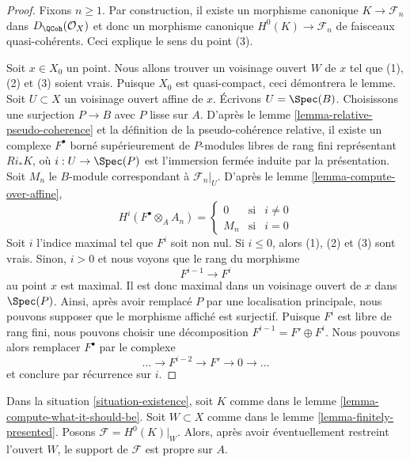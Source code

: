 \begin{proof}
Fixons $n \geq 1$. Par construction, il existe un morphisme canonique
$K \to \mathcal{F}_n$ dans $D_\QCoh(\mathcal{O}_X)$
et donc un morphisme canonique $H^0(K) \to \mathcal{F}_n$
de faisceaux quasi-cohérents. Ceci explique le sens du point (3).

\medskip\noindent
Soit $x \in X_0$ un point.
Nous allons trouver un voisinage ouvert $W$
de $x$ tel que (1), (2) et (3) soient vrais. Puisque $X_0$ est quasi-compact,
ceci démontrera le lemme. Soit $U \subset X$ un voisinage ouvert affine
de $x$. Écrivons $U = \Spec(B)$.
Choisissons une surjection $P \to B$ avec $P$ lisse sur $A$.
D'après le lemme \ref{lemma-relative-pseudo-coherence}
et la définition de la pseudo-cohérence relative,
il existe un complexe $F^\bullet$ borné supérieurement
de $P$-modules libres de rang fini représentant
$Ri_*K$, où $i : U \to \Spec(P)$ est l'immersion
fermée induite par la présentation.
Soit $M_n$ le $B$-module correspondant à $\mathcal{F}_n|_U$.
D'après le lemme \ref{lemma-compute-over-affine},
$$
H^i(F^\bullet \otimes_A A_n) =
\left\{
\begin{matrix}
0 & \text{si} & i \not = 0 \\
M_n & \text{si} & i = 0
\end{matrix}
\right.
$$
Soit $i$ l'indice maximal tel que $F^i$ soit non nul.
Si $i \leq 0$, alors (1), (2) et (3) sont vrais.
Sinon, $i > 0$ et nous voyons que le rang du morphisme
$$
F^{i - 1} \to F^i
$$
au point $x$ est maximal. Il est donc maximal dans un voisinage ouvert
de $x$ dans $\Spec(P)$. Ainsi, après avoir remplacé
$P$ par une localisation principale, nous pouvons supposer que le morphisme
affiché est surjectif. Puisque $F^i$ est libre de rang fini, nous pouvons choisir
une décomposition $F^{i - 1} = F' \oplus F^i$. Nous pouvons alors
remplacer $F^\bullet$ par le complexe
$$
\ldots \to F^{i - 2} \to F' \to 0 \to \ldots
$$
et conclure par récurrence sur $i$.
\end{proof}

\begin{lemma}
\label{lemma-proper-support}
Dans la situation \ref{situation-existence}, soit $K$ comme dans le
lemme \ref{lemma-compute-what-it-should-be}. Soit $W \subset X$
comme dans le lemme \ref{lemma-finitely-presented}.
Posons $\mathcal{F} = H^0(K)|_W$. Alors, après avoir éventuellement restreint l'ouvert $W$,
le support de $\mathcal{F}$ est propre sur $A$.
\end{lemma}

